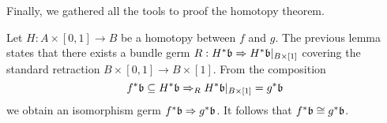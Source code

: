 \begin{file}
\begin{myparagraph}
    Finally, we gathered all the tools to proof the homotopy theorem.
\end{myparagraph}
\begin{myproof}
Let $H: A \times [0, 1] \to B$ be a homotopy between $f$ and $g$.
The previous lemma states that there exists a bundle germ $R: H^*\mathfrak{b} \Rightarrow H^*\mathfrak{b}\vert_{B \times [1]}$ covering the standard retraction $B \times [0, 1] \to B \times [1]$.
From the composition
\[ f^*\mathfrak{b} \subseteq{} H^*\mathfrak{b} \Rightarrow_R H^*\mathfrak{b}\vert_{B \times [1]} = g^*\mathfrak{b} \]
we obtain an isomorphism germ $f^*\mathfrak{b} \Rightarrow g^*\mathfrak{b}$.
It follows that $f^*\mathfrak{b} \cong g^*\mathfrak{b}$.
\end{myproof}

\end{file}